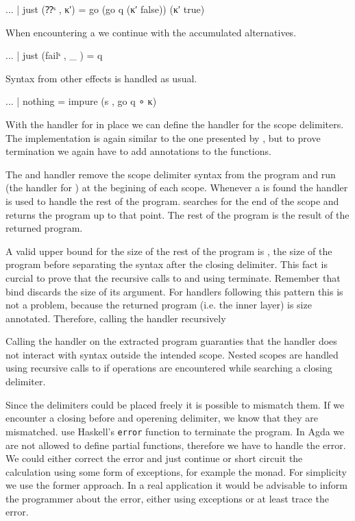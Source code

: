 \begin{AgdaAlign}
\begin{code}
    ... | just (⁇ˢ     , κ′)  = go (go q (κ′ false)) (κ′ true)
\end{code}
When encountering a  we continue with the accumulated
alternatives.

\begin{code}
    ... | just (failˢ  , _ )  = q
\end{code}
Syntax from other effects is handled as usual.

\begin{code}
    ... | nothing             = impure (s , go q ∘ κ)
\end{code}
\end{AgdaAlign}
With the handler for  in place we can define the handler for the
scope delimiters.
The implementation is again similar to the one presented by
\textcite{DBLP:conf/haskell/WuSH14}, but to prove termination we again have to
add  annotations to the functions.

The  and  handler remove the scope
delimiter syntax from the program and run  (the handler
for ) at the begining of each scope.
Whenever a  is found the handler  is
used to handle the rest of the program.
 searches for the end of the scope and returns the program
up to that point.
The rest of the program is the result of the returned program.

A valid upper bound for the size of the rest of the program is ,
the size of the program before separating the syntax after the closing delimiter.
This fact is curcial to prove that the recursive calls to  and
 using \AgdaFunction{>>=} terminate.
Remember that bind discards the size of its argument.
For handlers following this pattern this is not a problem, because the returned
program (i.e. the inner  layer) is size annotated.
Therefore, calling the handler recursively 


Calling the handler on the extracted program guaranties that the handler does
not interact with syntax outside the intended scope.
Nested scopes are handled using recursive calls to  if
 operations are encountered while searching a closing
delimiter.

Since the delimiters could be placed freely it is possible to mismatch them.
If we encounter a closing before and operening delimiter, we know that they are
mismatched.
\textcite{DBLP:conf/haskell/WuSH14} use Haskell's \texttt{error} function to
terminate the program.
In Agda we are not allowed to define partial functions, therefore we have to
handle the error.
We could either correct the error and just continue or short circuit the
calculation using some form of exceptions, for example the 
monad.
For simplicity we use the former approach.
In a real application it would be advisable to inform the programmer about the
error, either using exceptions or at least trace the error.

